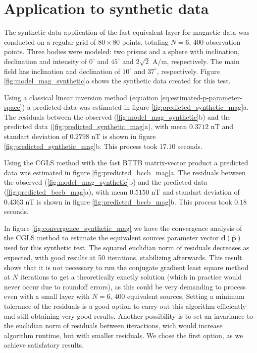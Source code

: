 \section{Application to synthetic data}

The synthetic data application of the fast equivalent layer for magnetic data was conducted on a regular grid of  $80 \times 80$ points, totaling $N = 6,\, 400$ observation points. Three bodies were modeled: two prisms and a sphere with inclination, declination and intensity of $0^{\circ}$ and $45^{\circ}$ and $2\sqrt{2}$ A/m, respectively. The main field has inclination and declination of $10^{\circ}$ and $37^{\circ}$, respectively. Figure \ref{fig:model_mag_synthetic}a shows the synthetic data created for this test.

Using a classical linear inversion method (equation \ref{eq:estimated-p-parameter-space}) a predicted data was estimated in figure \ref{fig:predicted_synthetic_mag}a. The residuals between the observed (\ref{fig:model_mag_synthetic}b) and the predicted data (\ref{fig:predicted_synthetic_mag}a), with mean $0.3712$ nT and standart deviation of $0.2798$ nT is shown in figure \ref{fig:predicted_synthetic_mag}b. This process took $17.10$ seconds.

Using the CGLS method with the fast BTTB matrix-vector product a predicted data was estimated in figure \ref{fig:predicted_bccb_mag}a. The residuals between the observed (\ref{fig:model_mag_synthetic}b) and the predicted data (\ref{fig:predicted_bccb_mag}a), with mean $0.5150$ nT and standart deviation of $0.4363$ nT is shown in figure \ref{fig:predicted_bccb_mag}b. This process took $0.18$ seconds.

In figure \ref{fig:convergence_synthetic_mag} we have the convergence analysis of the CGLS method to estimate the equivalent sources parameter vector $\mathbf{d}(\hat{\mathbf{p}})$ used for this synthetic test. The squared euclidian norm of residuals decreases as expected, with good results at 50 iterations, stabilizing afterwards. This result shows that it is not necessary to run the conjugate gradient least square method at $N$ iterations to get a theoretically exactly solution (which in practice would never occur due to roundoff errors), as this could be very demanding to process even with a small layer with $N = 6,\, 400$ equivalent sources. Setting a minimum tolerance of the residuals is a good option to carry out this algorithm efficiently and still obtaining very good results. Another possibility is to set an invariance to the euclidian norm of residuals between iteractions, wich would increase algorithm runtime, but with smaller residuals. We chose the first option, as we achieve satisfatory results.

